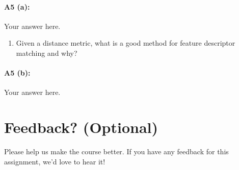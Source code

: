\paragraph{A5 (a):} Your answer here.





\pagebreak
\begin{enumerate}[resume*]
    \item Given a distance metric, what is a good method for feature descriptor matching and why?
\end{enumerate}

\paragraph{A5 (b):} Your answer here.








\pagebreak
\section*{Feedback? (Optional)}
Please help us make the course better. If you have any feedback for this assignment, we'd love to hear it!






